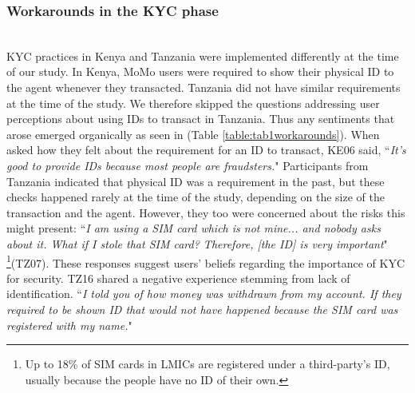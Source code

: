 \subsubsection{Workarounds in the KYC phase}
\label{Sec:KYCworkarounds}
\mbox{}
\\
KYC practices in Kenya and Tanzania were implemented differently at the time of our study.  In Kenya, MoMo users were required to show their physical ID to the agent whenever they transacted. Tanzania did not have similar requirements at the time of the study. We therefore skipped the questions addressing user perceptions about using  IDs to transact in Tanzania. Thus any sentiments that arose emerged organically as seen in (Table \ref{table:tab1workarounds}). When asked how they felt about the requirement for an ID to transact, KE06 said, ``\textit{It's good to provide IDs because most people are fraudsters.}"  Participants from Tanzania indicated that physical ID was a requirement in the past, but these checks happened rarely at the time of the study, depending on the size of the transaction and the agent. However, they too were concerned about the risks this might present: ``\textit{I am using a SIM card which is not mine... and nobody asks about it. What if I stole that SIM card? Therefore, [the ID] is very important}" \footnote{Up to 18\% of SIM cards in LMICs are registered under a third-party's ID, usually because the people have no ID of their own.}(TZ07). These responses suggest users' beliefs regarding the importance of KYC for security. TZ16 shared a negative experience stemming from lack of identification. ``\textit{I told you of how money was withdrawn from my account. If they required to be shown ID that would not have happened because the SIM card was registered with my name.}"

